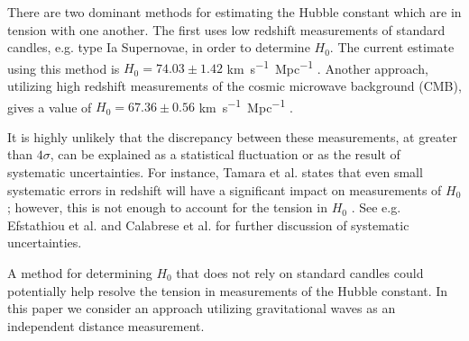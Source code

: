 There are two dominant methods for estimating the Hubble constant which are in tension with one another.
The first uses low redshift measurements of standard candles, e.g. type Ia Supernovae, in order to determine $H_0$.
The current estimate using this method is $H_0 = 74.03 \pm 1.42$ \si{km.s^{-1}.Mpc^{-1}} \cite{Riess_2019}.
Another approach, utilizing high redshift measurements of the cosmic microwave background (CMB), gives a value of $H_0 = 67.36 \pm 0.56$ \si{km.s^{-1}.Mpc^{-1}} \cite{Planck_2020}.

It is highly unlikely that the discrepancy between these measurements, at greater than $4\sigma$, can be explained as a statistical fluctuation or as the result of systematic uncertainties.
For instance, Tamara et al. states that even small systematic errors in redshift will have a significant impact on measurements of $H_0$; however, this is not enough to account for the tension in $H_0$ \cite{Davis_2019}.
See e.g. Efstathiou et al. and Calabrese et al. \cite{Efstathiou_2021,Calabrese_2008} for further discussion of systematic uncertainties.

A method for determining $H_0$ that does not rely on standard candles could potentially help resolve the tension in measurements of the Hubble constant.
In this paper we consider an approach utilizing gravitational waves as an independent distance measurement.




